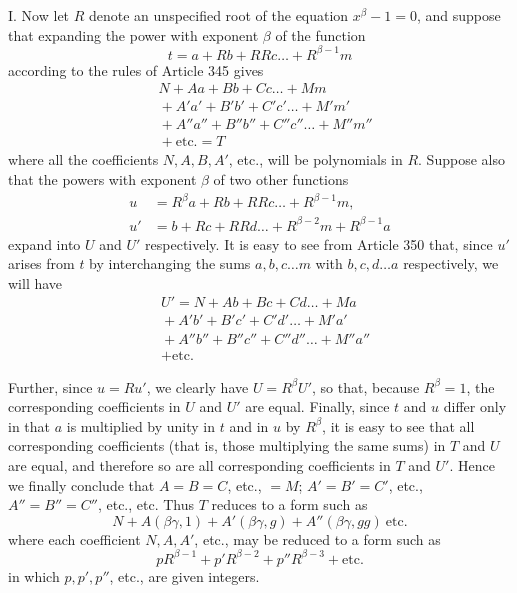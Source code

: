 I. Now let \(R\) denote an unspecified root of the equation \(x^\beta-1=0\), and suppose that expanding the power with exponent \(\beta\) of the function \[t=a+Rb+RRc\ldots+R^{\beta-1}m\] according to the rules of Article 345 gives \[\begin{aligned}&N+Aa+Bb+Cc\ldots+Mm\\&{}+A'a'+B'b'+C'c'\ldots+M'm'\\&{}+A''a''+B''b''+C''c''\ldots+M''m''\\&{}+\text{etc.}=T\end{aligned}\] where all the coefficients \(N,\allowbreak A,\allowbreak B,\allowbreak A'\), etc., will be polynomials in \(R\). Suppose also that the powers with exponent \(\beta\) of two other functions \[\begin{aligned}u&=R^\beta a+Rb+RRc\ldots+R^{\beta-1}m,\\u'&=b+Rc+RRd\ldots+R^{\beta-2}m+R^{\beta-1}a\end{aligned}\] expand into \(U\) and \(U'\) respectively. It is easy to see from Article 350 that, since \(u'\) arises from \(t\) by interchanging the sums \(a,\allowbreak b,\allowbreak c\ldots m\) with \(b,\allowbreak c,\allowbreak d\ldots a\) respectively, we will have \[\begin{aligned}&U'=N+Ab+Bc+Cd\ldots+Ma\\&{}+A'b'+B'c'+C'd'\ldots+M'a'\\&{}+A''b''+B''c''+C''d''\ldots+M''a''\\&{}+\text{etc.}\end{aligned}\]

Further, since \(u=Ru'\), we clearly have \(U=R^\beta U'\), so that, because \(R^\beta=1\), the corresponding coefficients in \(U\) and \(U'\) are equal. Finally, since \(t\) and \(u\) differ only in that \(a\) is multiplied by unity in \(t\) and in \(u\) by \(R^\beta\), it is easy to see that all corresponding coefficients (that is, those multiplying the same sums) in \(T\) and \(U\) are equal, and therefore so are all corresponding coefficients in \(T\) and \(U'\). Hence we finally conclude that \(A=B=C\), etc., \(=M\);
\(A'=B'=C'\), etc., \(A''=B''=C''\), etc., etc. Thus \(T\) reduces to a form such as \[N+A(\beta\gamma,1)+A'(\beta\gamma,g)+A''(\beta\gamma,gg)\ \text{etc.}\] where each coefficient \(N,\allowbreak A,\allowbreak A'\), etc., may be reduced to a form such as { \[pR^{\beta-1}+p'R^{\beta-2}+p''R^{\beta-3}+\text{etc.}\]} in which \(p,\allowbreak p',\allowbreak p''\), etc., are given integers.

